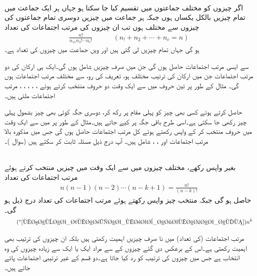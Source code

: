 \quad {}\\
اگر  چیزوں کو  مختلف جماعتوں میں تقسیم کیا جا سکتا ہو جہاں ہر ایک جماعت میں تمام چیزیں بالکل یکساں ہوں جبکہ ہر جماعت میں چیزیں دوسری تمام جماعتوں کی چیزوں سے مختلف ہوں تب ان چیزوں کی مرتب اجتماعات کی تعداد
\begin{align}
\frac{n!}{n_11n_2!\cdots n_c!}\quad\quad\quad (n_!+n_2+\cdots+n_c=n)
\end{align}
ہو گی جہاں تمام چیزیں لی گئی ہیں اور  ویں جماعت میں چیزوں کی تعداد  ہے۔

 سے ایسی مرتب اجتماعات حاصل ہوں گی جن میں  صرف  چیزیں شامل ہوں گی۔ایک ہی  ارکان کی دو  مرتب اجتماعات  جن میں ارکان کی ترتیب مختلف ہو، تعریف کی رو، سے مختلف مرتب اجتماعات ہوں گی۔  مثال کے طور پر تین حروف  میں سے ایک وقت دو حروف منتخب کرتے ہوئے ، ، ، ، ،  مرتب اجتماعات ملتی ہیں۔ 

 حاصل  کرتے ہوئے کسی بھی چیز کو پہلی مقام پر رکھ کر، دوسری جگہ کوئی بھی چیز بشمول پہلی چیز رکھی جا سکتی ہے۔اسی طرح باقی جگہ پر کیے جاتے ہیں۔مثال کے طور پر  میں سے ایک وقت میں  حروف منتخب کر کے واپس رکھتے ہوئے کل  مرتب اجتماعات حاصل ہوں گی جس میں مذکورہ بالا  مرتب اجتماعات اور ، ،  شامل ہیں۔ آپ درج ذیل مسئلہ ثابت کر سکتے ہیں (سوال )۔

\quad {}\\
بغیر واپس رکھے،  مختلف چیزوں میں سے ایک وقت میں  چیزیں منتخب کرتے ہوئے مرتب اجتماعات کی تعداد
\begin{align}\label{مساوات_شماریات_مرتب_اجتماعات_الف}
n(n-1)(n-2)\cdots (n-k+1)=\frac{n!}{(n-k)!}
\end{align}  
حاصل ہو گی جبکہ منتخب چیز واپس رکھتے ہوئے مرتب اجتماعات کی تعداد درج ذیل ہو گی۔
\begin{align*}\tag{$^*$\ref{مساوات_شماریات_مرتب_اجتماعات_الف}}
n^k
\end{align*}

مرتب اجتماعات (کی تعداد) میں نا صرف چیزیں اہمیت رکھتی ہیں بلکہ ان چیزوں کی ترتیب بھی اہمیت رکھتی ہے۔اس کے برعکس دی گئے چیزوں کے   سے مراد ایک یا ایک سے زیادہ چیزوں کی وہ انتخاب  ہے جس میں چیزوں کی ترتیب کو رد کیا جاتا ہے۔دو قسم کے غیر ترتیبی اجتماعات پائے جاتے ہیں۔

